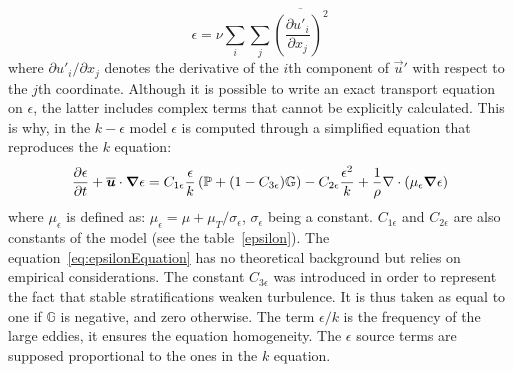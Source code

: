 \begin{equation}
  \epsilon = \nu \sum_i\sum_j\overline{\left(\dfrac{\partial u'_i}{\partial x_j}\right)^2}
\end{equation}
where $\partial u'_i/\partial x_j$  denotes the derivative of the $i$th component of $\vec u'$ with respect to the $j$th coordinate.
Although it is possible to write an exact transport equation on $\epsilon$, the latter includes complex terms that cannot be explicitly calculated.
This is why, in the $k-\epsilon$ model $\epsilon$ is computed through a simplified equation that reproduces the $k$ equation:
\begin{equation}\label{eq:epsilonEquation}
  \dfrac{\partial\epsilon}{\partial t}+\overline{\bm{u}}\cdot \bm{\nabla} \epsilon =
C_{1\epsilon}\dfrac{\epsilon}{k}\left(\mathbb P+(1-C_{3\epsilon})\mathbb G\right)  -C_{2\epsilon}\dfrac{\epsilon^2}{k}
+ \dfrac{1}{\rho}\nabla \cdot \left(\mu_\epsilon \bm{\nabla} \epsilon\right)
\end{equation}
where $\mu_\epsilon$ is defined as: $\mu_\epsilon = \mu+\mu_T/\sigma_\epsilon$, $\sigma_\epsilon$ being a constant.
$C_{1\epsilon}$ and $C_{2\epsilon}$ are also constants of the model (see the table~\ref{epsilon}).
The equation~\eqref{eq:epsilonEquation} has no theoretical background but relies on empirical considerations. The constant $C_{3\epsilon}$ was introduced in order to represent the fact that stable stratifications
weaken turbulence. It is thus taken as equal to one if $\mathbb G$ is negative, and zero otherwise.
The term $\epsilon/k$ is the frequency of the large eddies, it ensures the equation homogeneity.
The $\epsilon$ source terms are supposed proportional to the ones in the $k$ equation.\\

